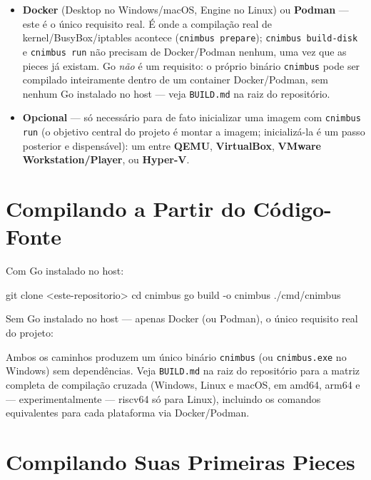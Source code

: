 \documentclass[11pt,letterpaper]{report}
\begin{document}
\begin{itemize}
  \item \textbf{Docker} (Desktop no Windows/macOS, Engine no Linux) ou
    \textbf{Podman} --- este é o único requisito real. É onde a
    compilação real de kernel/BusyBox/iptables acontece
    (\texttt{cnimbus prepare}); \texttt{cnimbus build-disk} e
    \texttt{cnimbus run} não precisam de Docker/Podman nenhum, uma vez
    que as pieces já existam. Go \textit{não} é um requisito: o próprio
    binário \texttt{cnimbus} pode ser compilado inteiramente dentro de
    um container Docker/Podman, sem nenhum Go instalado no host --- veja
    \texttt{BUILD.md} na raiz do repositório.
  \item \textbf{Opcional} --- só necessário para de fato inicializar
    uma imagem com \texttt{cnimbus run} (o objetivo central do projeto
    é montar a imagem; inicializá-la é um passo posterior e dispensável):
    um entre \textbf{QEMU}, \textbf{VirtualBox}, \textbf{VMware
    Workstation/Player}, ou \textbf{Hyper-V}.
\end{itemize}

\section{Compilando a Partir do Código-Fonte}

Com Go instalado no host:

\begin{shell}
git clone <este-repositorio>
cd cnimbus
go build -o cnimbus ./cmd/cnimbus
\end{shell}

Sem Go instalado no host --- apenas Docker (ou Podman), o único
requisito real do projeto:


Ambos os caminhos produzem um único binário \texttt{cnimbus} (ou
\texttt{cnimbus.exe} no Windows) sem dependências. Veja
\texttt{BUILD.md} na raiz do repositório para a matriz completa de
compilação cruzada (Windows, Linux e macOS, em amd64, arm64 e ---
experimentalmente --- riscv64 só para Linux), incluindo os comandos
equivalentes para cada plataforma via Docker/Podman.

\section{Compilando Suas Primeiras Pieces}
\end{document}
